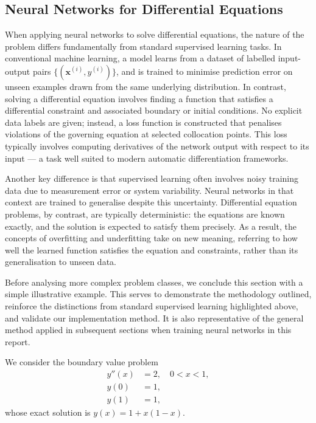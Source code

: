 \subsection{Neural Networks for Differential Equations}

When applying neural networks to solve differential equations, the nature of the problem differs 
fundamentally from standard supervised learning tasks. In conventional machine learning, a model 
learns from a dataset of labelled input-output pairs 
\( \{ (\mathbf{x}^{(i)}, y^{(i)}) \} \), and is trained to minimise prediction error on unseen
examples drawn from the same underlying distribution. In contrast, solving a differential equation 
involves finding a function that satisfies a differential constraint and associated boundary or 
initial conditions. No explicit data labels are given; instead, a loss function is constructed that 
penalises violations of the governing equation at selected collocation points. This loss typically 
involves computing derivatives of the network output with respect to its input — a task well suited 
to modern automatic differentiation frameworks.

Another key difference is that supervised learning often involves noisy training data due to 
measurement error or system variability. Neural networks in that context are trained to generalise 
despite this uncertainty. Differential equation problems, by contrast, are typically deterministic: 
the equations are known exactly, and the solution is expected to satisfy them precisely. As a result, 
the concepts of overfitting and underfitting take on new meaning, referring to how well the learned 
function satisfies the equation and constraints, rather than its generalisation to unseen data.

Before analysing more complex problem classes, we conclude this section with a simple illustrative 
example. This serves to demonstrate the methodology outlined, reinforce the distinctions 
from standard supervised learning highlighted above, and validate our implementation method. 
It is also representative of the general method applied in subsequent sections when training 
neural networks in this report.

We consider the boundary value problem
\[
\begin{aligned}
    y''(x) &= 2, \quad 0 < x < 1, \\
    y(0) &= 1, \\
    y(1) &= 1,
\end{aligned}
\]
whose exact solution is \( y(x) = 1 + x(1 - x) \).

